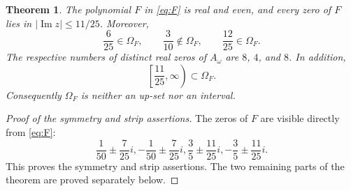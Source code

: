 \documentclass[10pt,a4paper]{amsart}
\newtheorem{theorem}{Theorem}
\newcommand{\OmegaF}{\Omega_F}
\begin{document}
\begin{theorem}\label{thm:main}
The polynomial $F$ in \eqref{eq:F} is real and even, and every zero of $F$
lies in $|\operatorname{Im}z|\leq11/25$. Moreover,
\[
  \frac6{25}\in\OmegaF,
  \qquad
  \frac3{10}\notin\OmegaF,
  \qquad
  \frac{12}{25}\in\OmegaF.
\]
The respective numbers of distinct real zeros of $A_\omega$ are $8$, $4$,
and $8$. In addition,
\[
  \left[\frac{11}{25},\infty\right)\subset\OmegaF.
\]
Consequently $\OmegaF$ is neither an up-set nor an interval.
\end{theorem}

\begin{proof}[Proof of the symmetry and strip assertions]
The zeros of $F$ are visible directly from \eqref{eq:F}:
\[
 \frac1{50}\mathbin{\pm}\frac7{25}i,
 -\frac1{50}\mathbin{\pm}\frac7{25}i,
 \frac35\mathbin{\pm}\frac{11}{25}i,
 -\frac35\mathbin{\pm}\frac{11}{25}i.
\]
This proves the symmetry and strip assertions. The two remaining parts of
the theorem are proved separately below.
\end{proof}
\end{document}
